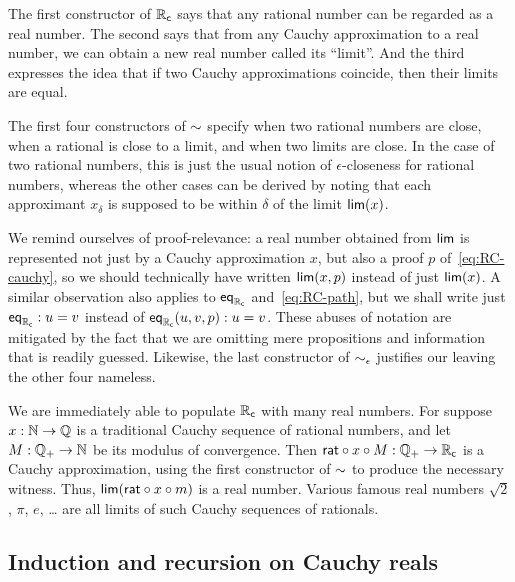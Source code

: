 \mentalpause

The first constructor of $\mathbb{R}_\mathsf{c}$ says that any rational number can be regarded as a real number.
The second says that from any Cauchy approximation to a real number, we can obtain a new real number called its ``limit''.
And the third expresses the idea that if two Cauchy approximations coincide, then their limits are equal.

The first four constructors of $\mathord\sim$ specify when two rational numbers are close, when a rational is close to a limit, and when two limits are close.
In the case of two rational numbers, this is just the usual notion of $\epsilon$-closeness for rational numbers, whereas the other cases can be derived by noting that each approximant $x_\delta$ is supposed to be within $\delta$ of the limit $\mathsf{lim}(x)$.

We remind ourselves of proof-relevance: a real number obtained from $\mathsf{lim}$ is represented not
just by a Cauchy approximation $x$, but also a proof $p$ of~\eqref{eq:RC-cauchy}, so we
should technically have written $\mathsf{lim}(x,p)$ instead of just $\mathsf{lim}(x)$.
A similar observation also applies to $\mathsf{eq}_{\mathbb{R}_\mathsf{c}}$ and~\eqref{eq:RC-path}, but we shall write just
$\mathsf{eq}_{\mathbb{R}_\mathsf{c}} : u = v$ instead of $\mathsf{eq}_{\mathbb{R}_\mathsf{c}}(u, v, p) : u = v$. These abuses of notation are
mitigated by the fact that we are omitting mere propositions and information that is
readily guessed.
Likewise, the last constructor of $\mathord{\sim_{\epsilon}}$ justifies our leaving the other four nameless.

We are immediately able to populate $\mathbb{R}_\mathsf{c}$ with many real numbers. For suppose $x : \mathbb{N} \to
\mathbb{Q}$ is a traditional Cauchy sequence of rational numbers, and let $M : \mathbb{Q}_{+} \to \mathbb{N}$ be its
modulus of convergence. Then $\mathsf{rat} \circ x \circ M : \mathbb{Q}_{+} \to \mathbb{R}_\mathsf{c}$ is a Cauchy
approximation, using the first constructor of $\mathord\sim$ to produce the necessary witness.
Thus, $\mathsf{lim}(\mathsf{rat} \circ x \circ m)$ is a real number. Various famous
real numbers $\sqrt{2}$, $\pi$, $e$, \dots{} are all limits of such Cauchy sequences of
rationals.

\subsection{Induction and recursion on Cauchy reals}
\label{sec:induct-recurs-cauchy}

